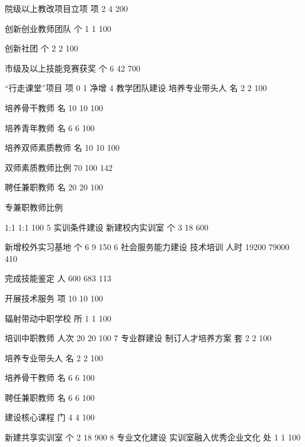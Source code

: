 院级以上教改项目立项
项
2
4
200%


创新创业教师团队
个
1
1
100%


创新社团
个
2
2
100%


市级及以上技能竞赛获奖
个
6
42
700%


“行走课堂”项目
项
0
1
净增
4
教学团队建设
培养专业带头人
名
2
2
100%


培养骨干教师
名
10
10
100%


培养青年教师
名
6
6
100%


培养双师素质教师
名
10
10
100%


双师素质教师比例
%
70
100
142%


聘任兼职教师
名
20
20
100%


专兼职教师比例

1:1
1:1
100%
5
实训条件建设
新建校内实训室
个
3
18
600%


新增校外实习基地
个
6
9
150%
6
社会服务能力建设
技术培训
人时
19200
79000
410%


完成技能鉴定
人
600
683
113%


开展技术服务
项
10
10
100%


辐射带动中职学校
所
1
1
100%


培训中职教师
人次
20
20
100%
7
专业群建设
制订人才培养方案
套
2
2
100%


培养专业带头人
名
2
2
100%


培养骨干教师
名
6
6
100%


聘任兼职教师
名
6
6
100%


建设核心课程
门
4
4
100%


新建共享实训室
个
2
18
900%
8
专业文化建设
实训室融入优秀企业文化
处
1
1
100%


